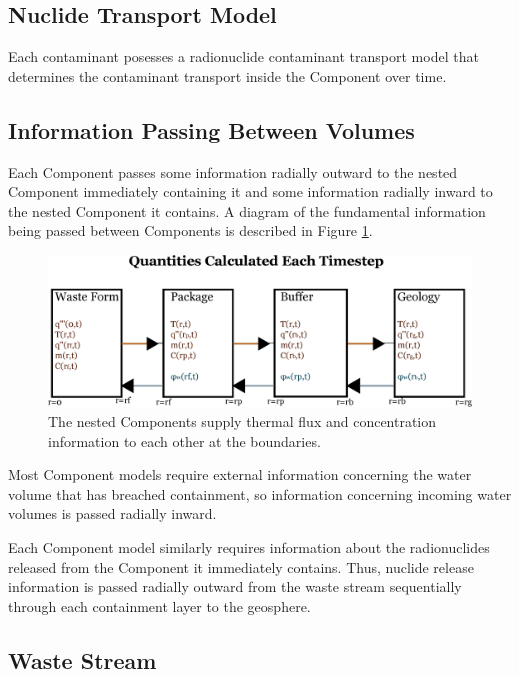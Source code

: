 \subsection{Nuclide Transport Model}

Each contaminant posesses a radionuclide contaminant transport model that determines the 
contaminant transport inside the Component over time. 

\subsection{Information Passing Between Volumes}

Each Component passes some information radially outward to the nested 
Component immediately containing it and some information radially 
inward to the nested Component it contains. A diagram of the fundamental
information being passed between Components is described in Figure 
\ref{fig:flow}.

\begin{figure}[h!]
  \begin{center}
    \includegraphics[width=\textwidth]{./chapters/paradigm/flow.eps}
  \end{center}
  \caption{The nested Components supply thermal flux and concentration 
  information to each other at the boundaries.}
  \label{fig:flow}
\end{figure}

Most Component models require external information concerning the 
water volume that has breached containment, so information concerning 
incoming water volumes is passed radially inward. 

Each Component model similarly requires information about the radionuclides 
released from the Component it immediately contains.  Thus, nuclide 
release information is passed radially outward from the waste stream 
sequentially through each containment layer to the geosphere.


\subsection{Waste Stream}

